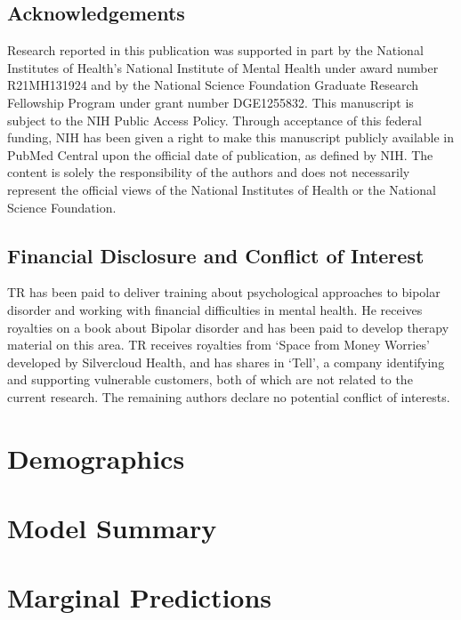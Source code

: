 \documentclass[10pt]{article}
\begin{document}
\subsection{Acknowledgements}

Research reported in this publication was supported in part by the National Institutes of Health's National Institute of Mental Health under award number R21MH131924 and by the National Science Foundation Graduate Research Fellowship Program under grant number DGE1255832. This manuscript is subject to the NIH Public Access Policy. Through acceptance of this federal funding, NIH has been given a right to make this manuscript publicly available in PubMed Central upon the official date of publication, as defined by NIH. The content is solely the responsibility of the authors and does not necessarily represent the official views of the National Institutes of Health or the National Science Foundation.

\subsection{Financial Disclosure and Conflict of Interest}
TR has been paid to deliver training about psychological approaches to bipolar disorder and working with financial difficulties in mental health. He receives royalties on a book about Bipolar disorder and has been paid to develop therapy material on this area. TR receives royalties from ‘Space from Money Worries’ developed by Silvercloud Health, and has shares in ‘Tell’, a company identifying and supporting vulnerable customers, both of which are not related to the current research. The remaining authors declare no potential conflict of interests.

\printbibliography

\newpage
\appendix

\section{Demographics}\label{app-1}

\newpage

\section{Model Summary}\label{app-2}

\newpage

\section{Marginal Predictions}\label{app-3}

\end{document}
